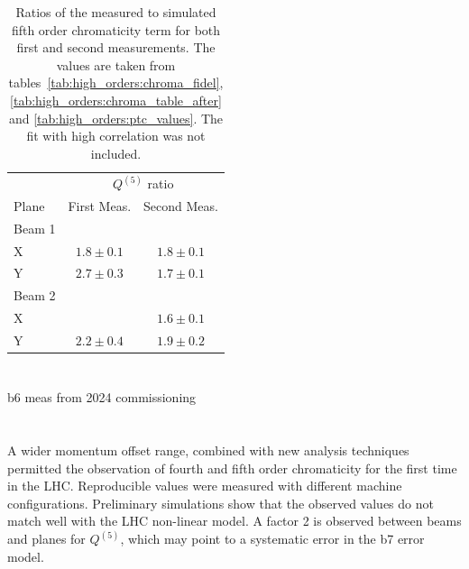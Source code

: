 \begin{table}[!htb]
    \centering
    \begin{tabular}{lcc}
      \toprule
                  &  \multicolumn{2}{c}{$Q^{(5)}$ ratio} \\
        Plane     &    First Meas.   &   Second Meas.\\
      \midrule
        Beam 1   &            & \\
        \hspace{2mm}X   & $1.8 \pm 0.1$ & $1.8 \pm 0.1$  \\
        \hspace{2mm}Y   & $2.7 \pm 0.3$ & $1.7 \pm 0.1$  \\
        Beam 2    &     & \\ 
        \hspace{2mm}X   &               & $1.6 \pm 0.1$  \\
        \hspace{2mm}Y   & $2.2 \pm 0.4$ & $1.9 \pm 0.2$  \\
      \bottomrule
    \end{tabular}
    \caption{Ratios of the measured to simulated fifth order chromaticity term for both first and
    second measurements.  The values are taken from tables~\cref{tab:high_orders:chroma_fidel},
    \ref{tab:high_orders:chroma_table_after} and \cref{tab:high_orders:ptc_values}. The fit with
    high correlation was not included.}
    \label{tab:high_orders:ptc_values_ratios}
\end{table}







\section{}

b6 meas from 2024 commissioning




\section{}

A wider momentum offset range, combined with new analysis techniques permitted the observation of fourth and fifth order chromaticity for the first time in the LHC. Reproducible values were measured with different machine configurations.
Preliminary simulations show that the observed values do not match well with the LHC non-linear model. A factor 2 is observed between beams and planes for $Q^{(5)}$, which may point to a systematic error in the b7 error model.

